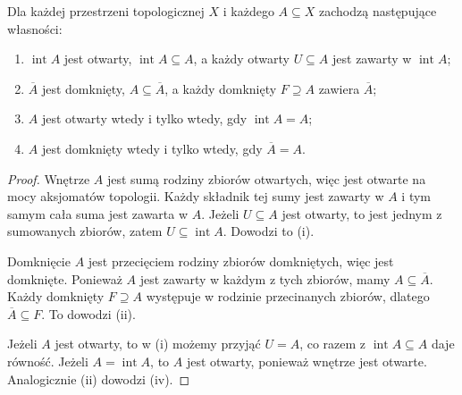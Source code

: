 \begin{stwierdzenie}
\label{prop:topog-ekstremalne}
Dla każdej przestrzeni topologicznej $X$ i każdego $A\subseteq X$
zachodzą następujące własności:
\begin{enumerate}[label=(\roman*)]
\item $\operatorname{int}A$ jest otwarty, $\operatorname{int}A\subseteq A$,
      a każdy otwarty $U\subseteq A$ jest zawarty w $\operatorname{int}A$;
\item $\overline A$ jest domknięty, $A\subseteq\overline A$,
      a każdy domknięty $F\supseteq A$ zawiera $\overline A$;
\item $A$ jest otwarty wtedy i tylko wtedy, gdy
      $\operatorname{int}A=A$;
\item $A$ jest domknięty wtedy i tylko wtedy, gdy $\overline A=A$.
\end{enumerate}
\end{stwierdzenie}
\begin{proof}
Wnętrze $A$ jest sumą rodziny zbiorów otwartych,
więc jest otwarte na mocy aksjomatów topologii. Każdy składnik tej
sumy jest zawarty w $A$ i tym samym cała suma jest zawarta w $A$.
Jeżeli $U\subseteq A$ jest otwarty, to jest jednym z sumowanych zbiorów,
zatem $U\subseteq\operatorname{int}A$. Dowodzi to (i).

Domknięcie $A$ jest przecięciem rodziny zbiorów domkniętych,
więc jest domknięte. Ponieważ $A$ jest zawarty w każdym z tych zbiorów,
mamy $A\subseteq\overline A$. Każdy domknięty $F\supseteq A$
występuje w rodzinie przecinanych zbiorów, dlatego
$\overline A\subseteq F$. To dowodzi (ii).

Jeżeli $A$ jest otwarty, to w (i) możemy przyjąć $U=A$,
co razem z $\operatorname{int}A\subseteq A$ daje równość.
Jeżeli $A=\operatorname{int}A$, to $A$ jest otwarty, ponieważ
wnętrze jest otwarte. Analogicznie (ii) dowodzi (iv).
\end{proof}

